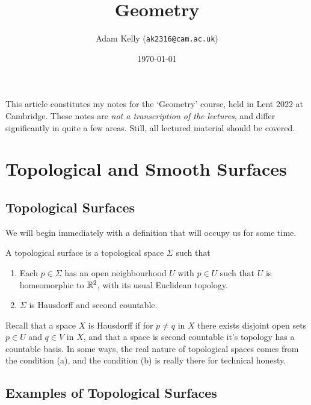 \documentclass[a4paper]{scrartcl}
\title{Geometry}
\author{Adam Kelly (\texttt{ak2316@cam.ac.uk})}
\date{\today}
\begin{document}
\maketitle


This article constitutes my notes for the `Geometry' course, held in Lent 2022 at Cambridge. These notes are \emph{not a transcription of the lectures}, and differ significantly in quite a few areas. Still, all lectured material should be covered.



\tableofcontents

\section{Topological and Smooth Surfaces}

\subsection{Topological Surfaces}

We will begin immediately with a definition that will occupy us for some time.

\begin{definition}
    A topological surface is a topological space $\Sigma$ such that
    \begin{enumerate}[label=(\roman*)]
        \item Each $p \in \Sigma$ has an open neighbourhood $U$ with $p \in U$ such that $U$ is homeomorphic to $\mathbb{R}^2$, with its usual Euclidean topology.
        \item $\Sigma$ is Hausdorff and second countable.
    \end{enumerate}    
\end{definition}

Recall that a space $X$ is Hausdorff if for $p \neq q$ in $X$ there exists disjoint open sets $p \in U$ and $q \in V$ in $X$, and that a space is second countable it's topology has a countable basis.
In some ways, the real nature of topological spaces comes from the condition (a), and the condition (b) is really there for technical honesty.

\subsection{Examples of Topological Surfaces}
\end{document}
